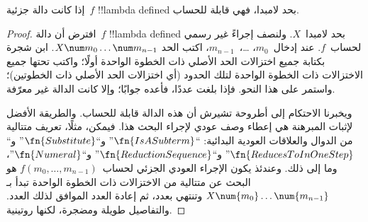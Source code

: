 \documentclass[../../../include/open-logic-section]{subfiles}
\begin{document}

\begin{thm}
إذا كانت دالة جزئية~$f$ !!{lambda defined} بحد لامبدا، فهي قابلة للحساب.
\end{thm}

\begin{proof}
افترض أن دالة~$f$ !!{lambda defined} بحد لامبدا~$X$. ولنصف إجراءً غير
رسمي لحساب~$f$. عند إدخال~$m_0$، \dots،~$m_{n-1}$، اكتب الحد
$X \num m_0 \ldots \num m_{n-1}$. ابن شجرة بكتابة جميع اختزالات الحد
الأصلي ذات الخطوة الواحدة أولًا؛ واكتب تحتها جميع الاختزالات ذات الخطوة
الواحدة لتلك الحدود (أي اختزالات الحد الأصلي ذات الخطوتين)؛ واستمر على
هذا النحو. فإذا بلغت عددًا، فأعده جوابًا؛ وإلا كانت الدالة غير معرّفة.

ويخبرنا الاحتكام إلى أطروحة تشيرش أن هذه الدالة قابلة للحساب. والطريقة
الأفضل لإثبات المبرهنة هي إعطاء وصف عودي لإجراء البحث هذا. فيمكن، مثلًا،
تعريف متتالية من الدوال والعلاقات العودية البدائية:
``$\fn{IsASubterm}$'' و``$\fn{Substitute}$''
و``$\fn{ReducesToInOneStep}$'' و``$\fn{ReductionSequence}$''
و``$\fn{Numeral}$''، وما إلى ذلك. وعندئذ يكون الإجراء العودي الجزئي
لحساب~$f(m_0, \dots, m_{n-1})$ هو البحث عن متتالية من الاختزالات ذات
الخطوة الواحدة تبدأ بـ$X \num{m_0} \dots \num{m_{n-1}}$ وتنتهي بعدد،
ثم إعادة العدد الموافق لذلك العدد. والتفاصيل طويلة ومضجرة، لكنها روتينية.
\end{proof}
\end{document}
